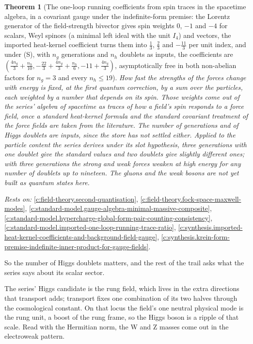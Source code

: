 \documentclass[11pt]{article}
\newtheorem{theorem}{Theorem}[section]
\theoremstyle{definition}
\theoremstyle{plain}
\begin{document}
\begin{theorem}[The one-loop running coefficients from spin traces in the spacetime algebra, in a covariant gauge under the indefinite-form premise: the Lorentz generator of the field-strength bivector gives spin weights $0$, $-1$ and $-4$ for scalars, Weyl spinors (a minimal left ideal with the unit $I_{4}$) and vectors, the imported heat-kernel coefficient turns them into $\tfrac13$, $\tfrac23$ and $-\tfrac{11}{3}$ per unit index, and under (S), with $n_{g}$ generations and $n_{h}$ doublets as inputs, the coefficients are $(\tfrac{4n_{g}}{3} + \tfrac{n_{h}}{10}, -\tfrac{22}{3} + \tfrac{4n_{g}}{3} + \tfrac{n_{h}}{6}, -11 + \tfrac{4n_{g}}{3})$, asymptotically free in both non-abelian factors for $n_{g} = 3$ and every $n_{h} \leq 19$]\label{c:synthesis.one-loop-running-coefficients-from-spacetime-algebra-spin-traces}
How fast the strengths of the forces change with energy is fixed, at the first quantum correction, by a sum over the particles, each weighted by a number that depends on its spin. Those weights come out of the series' algebra of spacetime as traces of how a field's spin responds to a force field, once a standard heat-kernel formula and the standard covariant treatment of the force fields are taken from the literature. The number of generations and of Higgs doublets are inputs, since the store has not settled either. Applied to the particle content the series derives under its slot hypothesis, three generations with one doublet give the standard values and two doublets give slightly different ones; with three generations the strong and weak forces weaken at high energy for any number of doublets up to nineteen. The gluons and the weak bosons are not yet built as quantum states here.
\end{theorem}
\noindent\emph{Rests on:} \ref{c:field-theory.second-quantisation}, \ref{c:field-theory.fock-space-maxwell-modes}, \ref{c:standard-model.gauge-algebra-minimal-massive-composite}, \ref{c:standard-model.hypercharge-global-form-pair-counting-consistency}, \ref{c:standard-model.imported-one-loop-running-trace-ratio}, \ref{c:synthesis.imported-heat-kernel-coefficients-and-background-field-gauge}, \ref{c:synthesis.krein-form-premise-indefinite-inner-product-for-gauge-fields}.

So the number of Higgs doublets matters, and the rest of the trail asks what the series says about its scalar sector.

The series' Higgs candidate is the rung field, which lives in the extra directions that transport adds; transport fixes one combination of its two halves through the cosmological constant. On that locus the field's one neutral physical mode is the rung unit, a boost of the rung frame, so the Higgs boson is a ripple of that scale. Read with the Hermitian norm, the W and Z masses come out in the electroweak pattern.
\end{document}
